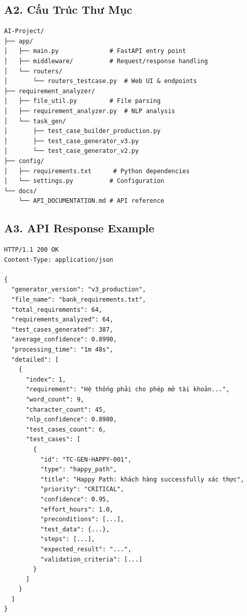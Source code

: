\documentclass[14pt,a4paper]{article}
\begin{document}
\subsection*{A2. Cấu Trúc Thư Mục}

\begin{lstlisting}
AI-Project/
├── app/
│   ├── main.py              # FastAPI entry point
│   ├── middleware/          # Request/response handling
│   └── routers/
│       └── routers_testcase.py  # Web UI & endpoints
├── requirement_analyzer/
│   ├── file_util.py         # File parsing
│   ├── requirement_analyzer.py  # NLP analysis
│   └── task_gen/
│       ├── test_case_builder_production.py
│       ├── test_case_generator_v3.py
│       └── test_case_generator_v2.py
├── config/
│   ├── requirements.txt      # Python dependencies
│   └── settings.py          # Configuration
└── docs/
    └── API_DOCUMENTATION.md # API reference
\end{lstlisting}

\subsection*{A3. API Response Example}

\begin{lstlisting}
HTTP/1.1 200 OK
Content-Type: application/json

{
  "generator_version": "v3_production",
  "file_name": "bank_requirements.txt",
  "total_requirements": 64,
  "requirements_analyzed": 64,
  "test_cases_generated": 387,
  "average_confidence": 0.8990,
  "processing_time": "1m 48s",
  "detailed": [
    {
      "index": 1,
      "requirement": "Hệ thống phải cho phép mở tài khoản...",
      "word_count": 9,
      "character_count": 45,
      "nlp_confidence": 0.8980,
      "test_cases_count": 6,
      "test_cases": [
        {
          "id": "TC-GEN-HAPPY-001",
          "type": "happy_path",
          "title": "Happy Path: khách hàng successfully xác thực",
          "priority": "CRITICAL",
          "confidence": 0.95,
          "effort_hours": 1.0,
          "preconditions": [...],
          "test_data": {...},
          "steps": [...],
          "expected_result": "...",
          "validation_criteria": [...]
        }
      ]
    }
  ]
}
\end{lstlisting}
\end{document}

